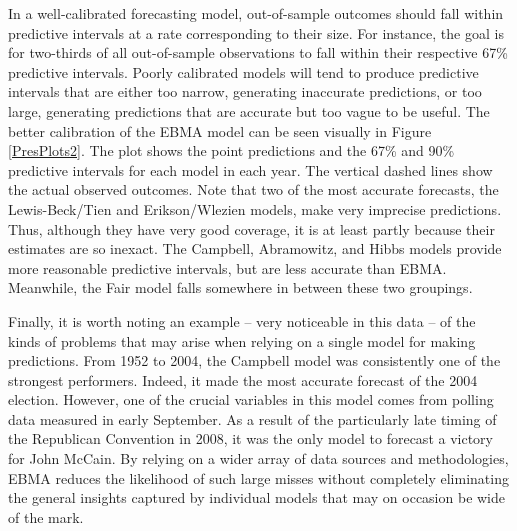 \documentclass[12pt,fullpage,endnotes]{article}
\begin{document}
 In a well-calibrated forecasting model, out-of-sample outcomes should
 fall within predictive intervals at a rate corresponding to their
 size.  For instance, the goal is for two-thirds of all out-of-sample
 observations to fall within their respective 67\% predictive
 intervals.  Poorly calibrated models will tend to produce predictive
 intervals that are either too narrow, generating inaccurate
 predictions, or too large, generating predictions that are accurate
 but too vague to be useful.  The better calibration of the EBMA model
 can be seen visually in Figure \ref{PresPlots2}.  The plot shows the
 point predictions and the 67\% and 90\% predictive intervals for each
 model in each year.  The vertical dashed lines show the actual
 observed outcomes.  Note that two of the most accurate forecasts, the
 Lewis-Beck/Tien and Erikson/Wlezien models, make very imprecise
 predictions.  Thus, although they have very good coverage, it is at
 least partly because their estimates are so inexact.  The Campbell,
 Abramowitz, and Hibbs models provide more reasonable predictive
 intervals, but are less accurate than EBMA. Meanwhile, the Fair model
 falls somewhere in between these two groupings.


 Finally, it is worth noting an example -- very noticeable in this
 data -- of the kinds of problems that may arise when relying on a
 single model for making predictions.  From 1952 to 2004, the Campbell
 model was consistently one of the strongest performers.  Indeed, it
 made the most accurate forecast of the 2004 election.  However, one
 of the crucial variables in this model comes from polling data
 measured in early September.  As a result of the particularly late
 timing of the Republican Convention in 2008, it was the only model to
 forecast a victory for John McCain.  By relying on a wider array of
 data sources and methodologies, EBMA reduces the likelihood of such
 large misses without completely eliminating the general insights
 captured by individual models that may on occasion be wide of the
 mark.
\end{document}
